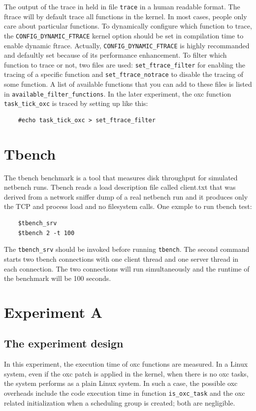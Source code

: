 The output of the trace in held in file \texttt{trace} in a human readable
format. The ftrace will by default trace all functions in the kernel. In
most cases, people only care about particular functions. To dynamically
configure which function to trace, the \texttt{CONFIG\_DYNAMIC\_FTRACE}
kernel option should be set in compilation time  to enable dynamic ftrace. 
Actually, \texttt{CONFIG\_DYNAMIC\_FTRACE} is highly recommanded and defaultly
set because of its performance enhancement. To filter which function to trace
or not, two files are used: \texttt{set\_ftrace\_filter} for enabling the
tracing of a specific function and \texttt{set\_ftrace\_notrace} to 
disable the tracing of some function. A list of available functions that you 
can add to these files is listed in \texttt{available\_filter\_functions}.
In the later experiment, the oxc function \texttt{task\_tick\_oxc} is traced
by setting up like this:
\begin{lstlisting}
	#echo task_tick_oxc > set_ftrace_filter
\end{lstlisting}


\section{Tbench}
The tbench \cite{tbench} benchmark is a tool that measures disk throughput 
for simulated netbench runs. Tbench reads a load description file called 
client.txt that was derived from a network sniffer dump of a real netbench 
run and %
it produces only the TCP and process load and no filesystem calls.
One exmple to run tbench test:
\begin{lstlisting}
	$tbench_srv
	$tbench 2 -t 100
\end{lstlisting}
The \texttt{tbench\_srv} should be invoked before running \texttt{tbench}.
The second command starts two tbench connections with one client thread 
and one server thread in each connection. The two connections will run 
simultaneously and the runtime of the benchmark will be 100 seconds.

\section{Experiment A}
\subsection{The experiment design}
In this experiment, the execution time of oxc functions are measured.
In a Linux system, even if the oxc patch is applied in the kernel, 
when there is no oxc tasks, the system performs as a plain Linux system. 
In such a case, the possible oxc overheads include the code execution time 
in function \texttt{is\_oxc\_task} and the oxc related initialization when 
a scheduling group is created; both are negligible.

